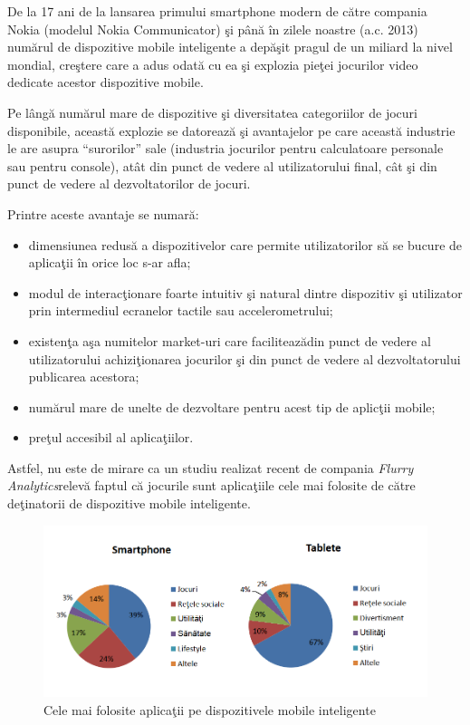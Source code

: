 \documentclass{article}
\begin{document}
	De la 17 ani de la lansarea primului smartphone modern de c\u{a}tre compania Nokia (modelul Nokia Communicator\footnotemark[2]) \c{s}i p\^{a}n\u{a} \^{i}n zilele noastre (a.c. 2013) num\u{a}rul de dispozitive mobile inteligente a dep\u{a}\c{s}it pragul de un miliard la nivel mondial, cre\c{s}tere care a adus odat\u{a} cu ea \c{s}i explozia pie\c{t}ei jocurilor video dedicate acestor dispozitive mobile.

	Pe l\^{a}ng\u{a} num\u{a}rul mare de dispozitive \c{s}i diversitatea categoriilor de jocuri disponibile, aceast\u{a} explozie se datoreaz\u{a} \c{s}i avantajelor pe care aceast\u{a} industrie le are asupra ``surorilor'' sale (industria jocurilor pentru calculatoare personale sau pentru console), at\^{a}t din punct de vedere al utilizatorului final, c\^{a}t \c{s}i din punct de vedere al dezvoltatorilor de jocuri.





\newpage
Printre aceste avantaje se numar\u{a}:

\begin{itemize}
	\item dimensiunea redus\u{a} a dispozitivelor care permite utilizatorilor s\u{a} se bucure de aplica\c{t}ii \^{i}n orice loc s-ar afla;
	\item modul de interac\c{t}ionare foarte intuitiv \c{s}i natural dintre dispozitiv \c{s}i utilizator prin intermediul ecranelor tactile sau accelerometrului;
	\item existen\c{t}a a\c{s}a numitelor market-uri care faciliteaz\u{a}din punct de vedere al utilizatorului achizi\c{t}ionarea jocurilor \c{s}i din punct de vedere al dezvoltatorului publicarea acestora;
	\item num\u{a}rul mare de unelte de dezvoltare pentru acest tip de aplic\c{t}ii mobile;
	\item pre\c{t}ul accesibil al aplica\c{t}iilor.
\end{itemize}


Astfel, nu este de mirare ca un studiu realizat recent de compania \textit{Flurry Analytics}\footnotemark[3] relev\u{a} faptul  c\u{a} jocurile sunt aplica\c{t}iile cele mai folosite de c\u{a}tre de\c{t}inatorii de dispozitive mobile inteligente.

\begin{figure}[h!]
 \includegraphics[scale=0.6]{fig3.png}
 \caption{Cele mai folosite aplica\c{t}ii pe dispozitivele mobile inteligente}
\end{figure}
 
\end{document}
